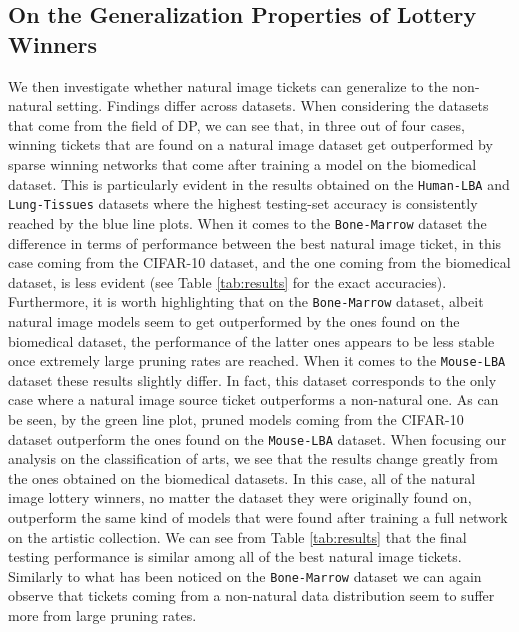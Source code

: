 




\subsection{On the Generalization Properties of Lottery Winners}
We then investigate whether natural image tickets can generalize to the non-natural setting. Findings differ across datasets. When considering the datasets that come from the field of DP, we can see that, in three out of four cases, winning tickets that are found on a natural image dataset get outperformed by sparse winning networks that come after training a model on the biomedical dataset. This is particularly evident in the results obtained on the \texttt{Human-LBA} and \texttt{Lung-Tissues} datasets where the highest testing-set accuracy is consistently reached by the blue line plots. When it comes to the \texttt{Bone-Marrow} dataset the difference in terms of performance between the best natural image ticket, in this case coming from the CIFAR-10 dataset, and the one coming from the biomedical dataset, is less evident (see Table \ref{tab:results} for the exact accuracies). Furthermore, it is worth highlighting that on the \texttt{Bone-Marrow} dataset, albeit natural image models seem to get outperformed by the ones found on the biomedical dataset, the performance of the latter ones appears to be less stable once extremely large pruning rates are reached.
When it comes to the \texttt{Mouse-LBA} dataset these results slightly differ. In fact, this dataset corresponds to the only case where a natural image source ticket outperforms a non-natural one. As can be seen, by the green line plot, pruned models coming from the CIFAR-10 dataset outperform the ones found on the \texttt{Mouse-LBA} dataset. When focusing our analysis on the classification of arts, we see that the results change greatly from the ones obtained on the biomedical datasets. In this case, all of the natural image lottery winners, no matter the dataset they were originally found on, outperform the same kind of models that were found after training a full network on the artistic collection. We can see from Table \ref{tab:results} that the final testing performance is similar among all of the best natural image tickets. Similarly to what has been noticed on the \texttt{Bone-Marrow} dataset we can again observe that tickets coming from a non-natural data distribution seem to suffer more from large pruning rates. 

